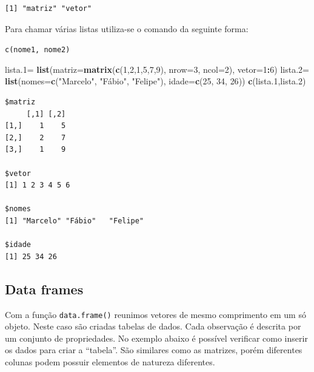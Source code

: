 \documentclass[12pt,brazil,oneside]{book}
\newenvironment{Shaded}{\begin{snugshade}}{\end{snugshade}}
\newcommand{\DataTypeTok}[1]{\textcolor[rgb]{0.13,0.29,0.53}{#1}}
\newcommand{\DecValTok}[1]{\textcolor[rgb]{0.00,0.00,0.81}{#1}}
\newcommand{\FloatTok}[1]{\textcolor[rgb]{0.00,0.00,0.81}{#1}}
\newcommand{\KeywordTok}[1]{\textcolor[rgb]{0.13,0.29,0.53}{\textbf{#1}}}
\newcommand{\NormalTok}[1]{#1}
\newcommand{\OperatorTok}[1]{\textcolor[rgb]{0.81,0.36,0.00}{\textbf{#1}}}
\newcommand{\StringTok}[1]{\textcolor[rgb]{0.31,0.60,0.02}{#1}}
\begin{document}
\begin{verbatim}
[1] "matriz" "vetor" 
\end{verbatim}

Para chamar várias listas utiliza-se o comando da seguinte forma:

\texttt{c(nome1,\ nome2)}

\begin{Shaded}
\begin{Highlighting}[]
\NormalTok{lista}\FloatTok{.1}\NormalTok{=}\StringTok{ }\KeywordTok{list}\NormalTok{(}\DataTypeTok{matriz=}\KeywordTok{matrix}\NormalTok{(}\KeywordTok{c}\NormalTok{(}\DecValTok{1}\NormalTok{,}\DecValTok{2}\NormalTok{,}\DecValTok{1}\NormalTok{,}\DecValTok{5}\NormalTok{,}\DecValTok{7}\NormalTok{,}\DecValTok{9}\NormalTok{), }\DataTypeTok{nrow=}\DecValTok{3}\NormalTok{, }\DataTypeTok{ncol=}\DecValTok{2}\NormalTok{),}
              \DataTypeTok{vetor=}\DecValTok{1}\OperatorTok{:}\DecValTok{6}\NormalTok{)}
\NormalTok{lista}\FloatTok{.2}\NormalTok{=}\StringTok{ }\KeywordTok{list}\NormalTok{(}\DataTypeTok{nomes=}\KeywordTok{c}\NormalTok{(}\StringTok{"Marcelo"}\NormalTok{, }\StringTok{"Fábio"}\NormalTok{, }\StringTok{"Felipe"}\NormalTok{), }
              \DataTypeTok{idade=}\KeywordTok{c}\NormalTok{(}\DecValTok{25}\NormalTok{, }\DecValTok{34}\NormalTok{, }\DecValTok{26}\NormalTok{))}
\KeywordTok{c}\NormalTok{(lista}\FloatTok{.1}\NormalTok{,lista}\FloatTok{.2}\NormalTok{)}
\end{Highlighting}
\end{Shaded}

\begin{verbatim}
$matriz
     [,1] [,2]
[1,]    1    5
[2,]    2    7
[3,]    1    9

$vetor
[1] 1 2 3 4 5 6

$nomes
[1] "Marcelo" "Fábio"   "Felipe" 

$idade
[1] 25 34 26
\end{verbatim}

\hypertarget{data-frames}{%
\subsection{Data frames}\label{data-frames}}

Com a função \texttt{data.frame()} reunimos vetores de mesmo comprimento em um só objeto. Neste caso são criadas tabelas de dados. Cada observação é descrita por um conjunto de propriedades. No exemplo abaixo é possível verificar como inserir os dados para criar a ``tabela''. São similares como as matrizes, porém diferentes colunas podem possuir elementos de natureza diferentes.
\end{document}
